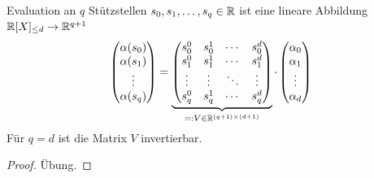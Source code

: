 \begin{lemma}
    Evaluation an $q$ Stützstellen $s_0,s_1,\ldots,s_q\in\mathbb{R}$ ist eine lineare Abbildung $\mathbb{R}[X]_{\leq d} \to \mathbb{R}^{q+1}$
    \[\begin{pmatrix}
          \alpha(s_0) \\ \alpha(s_1) \\ \vdots \\ \alpha(s_q)
    \end{pmatrix} = \underbrace{\begin{pmatrix}
                                    s_0^0  & s_0^1  & \cdots & s_0^d  \\
                                    s_1^0  & s_1^1  & \cdots & s_1^d  \\
                                    \vdots & \vdots & \ddots & \vdots \\
                                    s_q^0  & s_q^1  & \cdots & s_q^d
    \end{pmatrix}}_{=:V \in \mathbb{R}^{(q+1)\times(d+1)}}\cdot\begin{pmatrix}
                                                            \alpha_0 \\ \alpha_1 \\ \vdots \\ \alpha_d
    \end{pmatrix}\]
    Für $q=d$ ist die Matrix $V$ invertierbar.
\end{lemma}
\begin{proof}
    Übung.
\end{proof}

